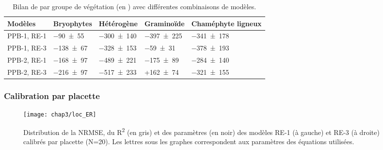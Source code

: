\begin{table}
\centering
\caption{Bilan de \coo par groupe de végétation (en \si{\gcma}) avec différentes combinaisons de modèles.}
\label{table:bdc_grp}
\begin{tabular}{lllll}  \toprule
Modèles & Bryophytes & Hétérogène & Graminoïde & Chaméphyte ligneux  \\ \midrule
PPB-1, RE-1 &  \num{-90(55)} & \num{-300(140)} & \num{-397(225)} & \num{-341(178)}\\[+1ex]
PPB-1, RE-3 &  \num{-138(67)} & \num{-328(153)} & \num{-59(31)} & \num{-378(193)} \\[+1ex]
PPB-2, RE-1 &  \num{-168(97)} & \num{-489(221)} & \num{-175(89)} & \num{-284(140)} \\[+1ex]
PPB-2, RE-3 &  \num{-216(97)} & \num{-517(233)} & +\num{162(74)} & \num{-321(155)} \\[+1ex]
\bottomrule
\end{tabular}
\end{table}

\subsubsection{Calibration par placette}


\begin{figure}
\centering
\texttt{[image: chap3/loc\_ER]}
\caption{Distribution de la NRMSE, du R\textsuperscript{2} (en gris) et des paramètres (en noir) des modèles RE-1 (à gauche) et RE-3 (à droite) calibrés par placette (N=20). Les lettres sous les graphes correspondent aux paramètres des équations utilisées.}
\label{fig:loc_ER}
\end{figure}


